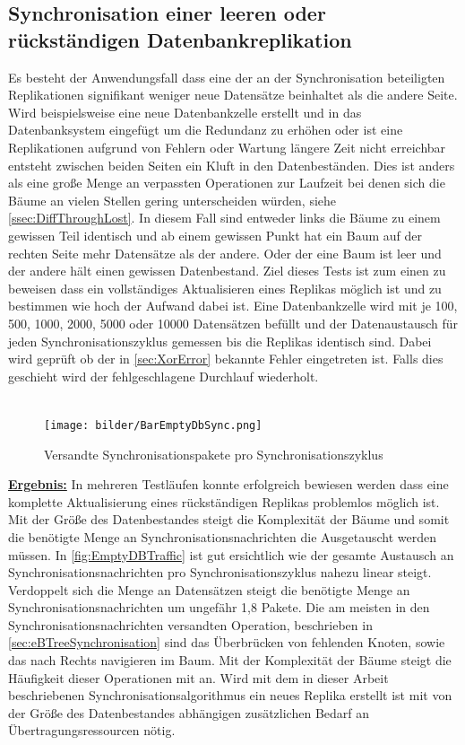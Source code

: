 \documentclass[a4paper,11pt,oneside,%
headsepline,												%
footsepline,												%
bibtotocnumbered									%
]{scrreprt}
\begin{document}
\subsection{Synchronisation einer leeren oder rückständigen Datenbankreplikation}
\label{ssec:EmptyDBTest}
Es besteht der Anwendungsfall dass eine der an der Synchronisation beteiligten Replikationen signifikant weniger neue Datensätze beinhaltet als die andere Seite. Wird beispielsweise eine neue Datenbankzelle erstellt und in das Datenbanksystem eingefügt um die Redundanz zu erhöhen oder ist eine Replikationen aufgrund von Fehlern oder Wartung längere Zeit nicht erreichbar entsteht zwischen beiden Seiten ein Kluft in den Datenbeständen. Dies ist anders als eine große Menge an verpassten Operationen zur Laufzeit bei denen sich die Bäume an vielen Stellen gering unterscheiden würden, siehe \autoref{ssec:DiffThroughLost}. In diesem Fall sind entweder links die Bäume zu einem gewissen Teil identisch und ab einem gewissen Punkt hat ein Baum auf der rechten Seite mehr Datensätze als der andere. Oder der eine Baum ist leer und der andere hält einen gewissen Datenbestand. Ziel dieses Tests ist zum einen zu beweisen dass ein vollständiges Aktualisieren eines Replikas möglich ist und zu bestimmen wie hoch der Aufwand dabei ist. Eine Datenbankzelle wird mit je 100, 500, 1000, 2000, 5000 oder 10000 Datensätzen befüllt und der Datenaustausch für jeden Synchronisationszyklus gemessen bis die Replikas identisch sind. Dabei wird geprüft ob der in \autoref{sec:XorError} bekannte Fehler eingetreten ist. Falls dies geschieht wird der fehlgeschlagene Durchlauf  wiederholt.\\\\
\begin{figure}[h!]
  \begin{center}
    \texttt{[image: bilder/BarEmptyDbSync.png]}
  \end{center}
 \caption{Versandte Synchronisationspakete pro Synchronisationszyklus}
  \label{fig:EmptyDBTraffic}
\end{figure}
\underline{{\bf Ergebnis:}} In mehreren Testläufen konnte erfolgreich bewiesen werden dass eine komplette Aktualisierung eines rückständigen Replikas problemlos möglich ist. Mit der Größe des Datenbestandes steigt die Komplexität der Bäume und somit die benötigte Menge an Synchronisationsnachrichten die Ausgetauscht werden müssen. In \autoref{fig:EmptyDBTraffic} ist gut ersichtlich wie der gesamte Austausch an Synchronisationsnachrichten pro Synchronisationszyklus nahezu linear steigt. Verdoppelt sich die Menge an Datensätzen steigt die benötigte Menge an Synchronisationsnachrichten um ungefähr 1,8 Pakete. Die am meisten in den Synchronisationsnachrichten versandten Operation, beschrieben in \autoref{sec:eBTreeSynchronisation} sind das Überbrücken von fehlenden Knoten, sowie das nach Rechts navigieren im Baum. Mit der Komplexität der Bäume steigt die Häufigkeit dieser Operationen mit an. Wird mit dem in dieser Arbeit beschriebenen Synchronisationsalgorithmus ein neues Replika erstellt ist mit von der Größe des Datenbestandes abhängigen zusätzlichen Bedarf an Übertragungsressourcen nötig.
\end{document}
